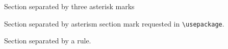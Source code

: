 \documentclass{article}
\begin{document}
Section separated by three asterisk marks
\sectionbreak[!!!]

Section separated by asterism section mark requested in \verb|\usepackage|.
\sectionbreak

Section separated by a rule.
\sectionbreakmark{\rule{10em}{3pt}}
\sectionbreak
\end{document}

